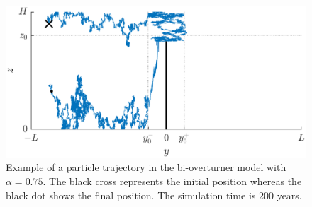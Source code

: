 \begin{figure}[!htp]
	\centering
	\includegraphics[width=\textwidth]{fig/problem2box/traj_without_transfer5.eps}
	\caption{Example of a particle trajectory in the bi-overturner model with $\alpha = 0.75$. The black cross represents the initial position whereas the black dot shows the final position. The simulation time is 200 years.}
	\label{fig:withouttransfer}
\end{figure}

